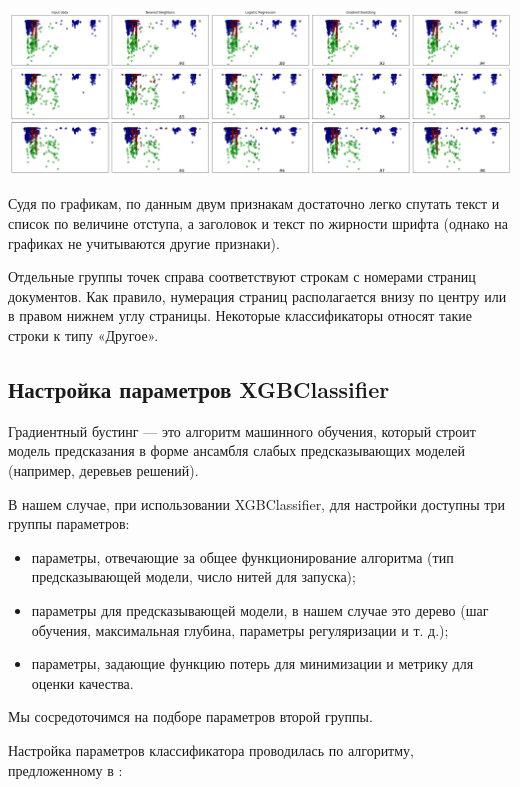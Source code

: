 \documentclass[a4paper,12pt]{article}
\begin{document}
\begin{center}
	\includegraphics[width=1.0\textwidth]{pics/graphics.png}
\end{center}

Судя по графикам, по данным двум признакам достаточно легко спутать текст и список по величине отступа, а заголовок и текст по жирности шрифта (однако на графиках не учитываются другие признаки).

Отдельные группы точек справа соответствуют строкам с номерами страниц документов. Как правило, нумерация страниц располагается внизу по центру или в правом нижнем углу страницы. Некоторые классификаторы относят такие строки к типу «Другое».

\subsection{Настройка параметров XGBClassifier}

Градиентный бустинг — это алгоритм машинного обучения, который строит модель предсказания в форме ансамбля слабых предсказывающих моделей (например, деревьев решений).

В нашем случае, при использовании XGBClassifier, для настройки доступны три группы параметров:

\begin{itemize}

	\item параметры, отвечающие за общее функционирование алгоритма (тип предсказывающей модели, число нитей для запуска);
	\item параметры для предсказывающей модели, в нашем случае это дерево (шаг обучения, максимальная глубина, параметры регуляризации и т. д.);
	\item параметры, задающие функцию потерь для минимизации и метрику для оценки качества.

\end{itemize}

Мы сосредоточимся на подборе параметров второй группы.

Настройка параметров классификатора проводилась по алгоритму, предложенному в \cite{link9}:
\end{document}
